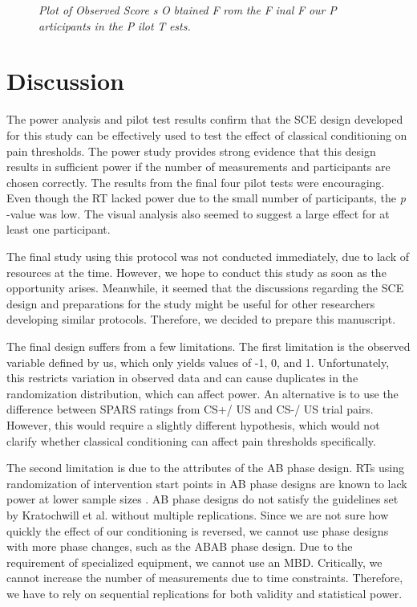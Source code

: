 \documentclass{article}
\begin{document}
  \begin{figure}

  \caption{\emph{Plot of }\emph{Observed Score} \emph{s }\emph{O} \emph{btained }\emph{F} \emph{rom} \emph{the }\emph{F} \emph{inal }\emph{F} \emph{our }\emph{P} \emph{articipants in the }\emph{P} \emph{ilot }\emph{T} \emph{ests.} }
\label{Figure 4}
 

\end{figure}
\section{Discussion} 

The power analysis and pilot test results confirm that the SCE design developed for this study can be effectively used to test the effect of classical conditioning on pain thresholds. The power study provides strong evidence that this design results in sufficient power if the number of measurements and participants are chosen correctly. The results from the final four pilot tests were encouraging. Even though the RT lacked power due to the small number of participants, the \emph{p} -value was low. The visual analysis also seemed to suggest a large effect for at least one participant. 

The final study using this protocol was not conducted immediately, due to lack of resources at the time. However, we hope to conduct this study as soon as the opportunity arises. Meanwhile, it seemed that the discussions regarding the SCE design and preparations for the study might be useful for other researchers developing similar protocols. Therefore, we decided to prepare this manuscript.

The final design suffers from a few limitations. The first limitation is the observed variable defined by us, which only yields values of -1, 0, and 1. Unfortunately, this restricts variation in observed data and can cause duplicates in the randomization distribution, which can affect power. An alternative is to use the difference between SPARS ratings from CS+/ US  and CS-/ US  trial pairs. However, this would require a slightly different hypothesis, which would not clarify whether classical conditioning can affect pain thresholds specifically. 

The second limitation is due to the attributes of the AB phase design. RTs using randomization of intervention start points in AB phase designs are known to lack power at lower sample sizes \autocite{bib46} . AB phase designs do not satisfy the guidelines set by Kratochwill et al. \autocite{bib26} without multiple replications. Since we are not sure how quickly the effect of our conditioning is reversed, we cannot use phase designs with more phase changes, such as the ABAB phase design. Due to the requirement of specialized equipment, we cannot use an MBD. Critically, we cannot increase the number of measurements due to time constraints. Therefore, we have to rely on sequential replications for both validity and statistical power. 
\end{document}
